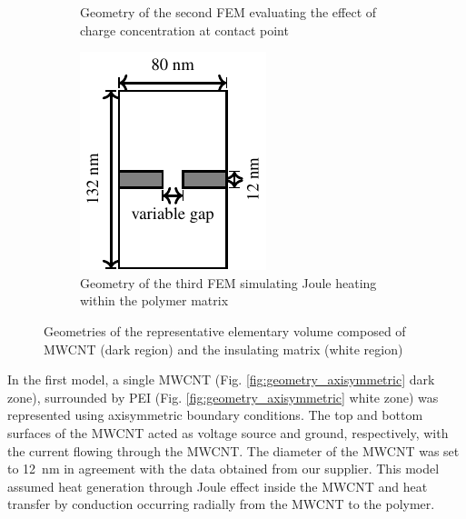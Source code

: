 \documentclass[11pt,review,times]{article}
\begin{document}
\begin{figure}[htb]
\begin{subfigure}{0.44\textwidth}
		\caption{Geometry of the second FEM evaluating the effect of charge concentration at contact point}
		\label{fig:geometry_3D}
	\end{subfigure}
	\begin{subfigure}{0.27\textwidth}
		\center
		\captionsetup{width=0.9\textwidth}
		\includegraphics[width=\textwidth]{geometry_gap}
		\caption{Geometry of the third FEM simulating Joule heating within the polymer matrix}
		\label{fig:geometry_gap}
	\end{subfigure} 
	\caption{Geometries of the representative elementary volume composed of MWCNT (dark region) and the insulating matrix (white region) \cite{Brassard2018_figshare_article1}}
	\label{fig:geometry}
\end{figure}

\FloatBarrier

In the first model, a single MWCNT (Fig. \ref{fig:geometry_axisymmetric} dark zone), surrounded by PEI (Fig. \ref{fig:geometry_axisymmetric} white zone) was represented using axisymmetric boundary conditions. 
The top and bottom surfaces of the MWCNT acted as voltage source and ground, respectively, with the current flowing through the MWCNT. 
The diameter of the MWCNT was set to \SI{12}{\nano\metre} in agreement with the data obtained from our supplier. 
This model assumed heat generation through Joule effect inside the MWCNT and heat transfer by conduction occurring radially from the MWCNT to the polymer.
\end{document}

